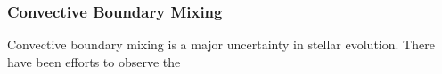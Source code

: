 {\color{purple}
\subsubsection{Convective Boundary Mixing}
}

Convective boundary mixing is a major uncertainty in stellar evolution. There have been efforts to observe the 

